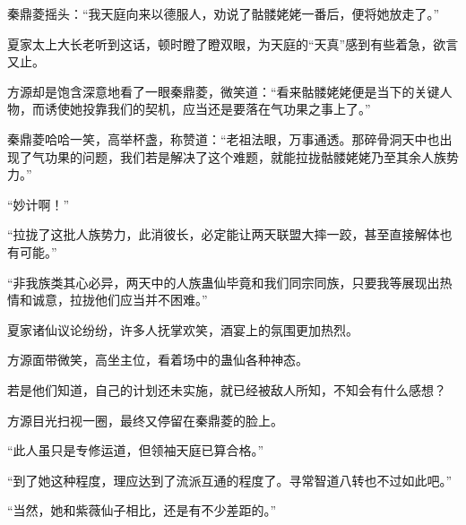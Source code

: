 \begin{this_body}
秦鼎菱摇头：“我天庭向来以德服人，劝说了骷髅姥姥一番后，便将她放走了。”

夏家太上大长老听到这话，顿时瞪了瞪双眼，为天庭的“天真”感到有些着急，欲言又止。

方源却是饱含深意地看了一眼秦鼎菱，微笑道：“看来骷髅姥姥便是当下的关键人物，而诱使她投靠我们的契机，应当还是要落在气功果之事上了。”

秦鼎菱哈哈一笑，高举杯盏，称赞道：“老祖法眼，万事通透。那碎骨洞天中也出现了气功果的问题，我们若是解决了这个难题，就能拉拢骷髅姥姥乃至其余人族势力。”

“妙计啊！”

“拉拢了这批人族势力，此消彼长，必定能让两天联盟大摔一跤，甚至直接解体也有可能。”

“非我族类其心必异，两天中的人族蛊仙毕竟和我们同宗同族，只要我等展现出热情和诚意，拉拢他们应当并不困难。”

夏家诸仙议论纷纷，许多人抚掌欢笑，酒宴上的氛围更加热烈。

方源面带微笑，高坐主位，看着场中的蛊仙各种神态。

若是他们知道，自己的计划还未实施，就已经被敌人所知，不知会有什么感想？

方源目光扫视一圈，最终又停留在秦鼎菱的脸上。

“此人虽只是专修运道，但领袖天庭已算合格。”

“到了她这种程度，理应达到了流派互通的程度了。寻常智道八转也不过如此吧。”

“当然，她和紫薇仙子相比，还是有不少差距的。”

\end{this_body}

